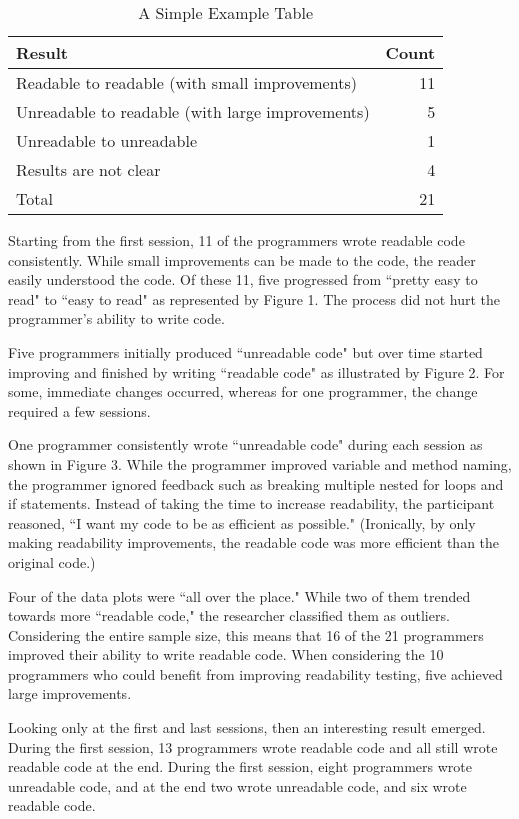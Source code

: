 \documentclass[conference]{IEEEtran}
\begin{document}
\begin{table}[!t]
\renewcommand{\arraystretch}{1.3}
\caption{A Simple Example Table}
\label{table_example}
\centering
\begin{tabular}{l||r}
\hline
\bfseries Result & \bfseries Count\\
\hline\hline
Readable to readable (with small improvements) & 11\\
\hline
Unreadable to readable (with large improvements) & 5\\
\hline
Unreadable to unreadable & 1\\
\hline
Results are not clear & 4\\
\hline
Total & 21\\
\hline
\end{tabular}
\end{table}

Starting from the first session, 11 of the programmers wrote readable code consistently. While small improvements can be made to the code, the reader easily understood the code. Of these 11, five progressed from ``pretty easy to read" to ``easy to read" as represented by Figure 1. The process did not hurt the programmer’s ability to write code.

Five programmers initially produced ``unreadable code" but over time started improving and finished by writing ``readable code" as illustrated by Figure 2. For some, immediate changes occurred, whereas for one programmer, the change required a few sessions.

One programmer consistently wrote ``unreadable code" during each session as shown in Figure 3. While the programmer improved variable and method naming, the programmer ignored feedback such as breaking multiple nested for loops and if statements. Instead of taking the time to increase readability, the participant reasoned, ``I want my code to be as efficient as possible." (Ironically, by only making readability improvements, the readable code was more efficient than the original code.)

Four of the data plots were ``all over the place." While two of them trended towards more ``readable code," the researcher classified them as outliers. Considering the entire sample size, this means that 16 of the 21 programmers improved their ability to write readable code. When considering the 10 programmers who could benefit from improving readability testing, five achieved large improvements.

Looking only at the first and last sessions, then an interesting result emerged. During the first session, 13 programmers wrote readable code and all still wrote readable code at the end. During the first session, eight programmers wrote unreadable code, and at the end two wrote unreadable code, and six wrote readable code.
\end{document}
